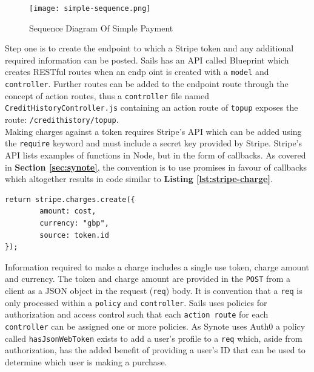 \begin{figure}[!hbt]
  	\centering
 	\texttt{[image: simple-sequence.png]}
  	\caption{Sequence Diagram Of Simple Payment}
 	\label{fig:simple-sequence}
\end{figure}

Step one is to create the endpoint to which a Stripe token and any additional required information can be posted. Sails has an API called Blueprint which creates RESTful routes when an endp oint is created with a \texttt{model} and \texttt{controller}. Further routes can be added to the endpoint route through the concept of action routes, thus a \texttt{controller} file named \texttt{CreditHistoryController.js} containing an action route of \texttt{topup} exposes the route: \texttt{/credithistory/topup}.\\

Making charges against a token requires Stripe's API \cite{stripe-api} which can be added using the \texttt{require} keyword and must include a secret key provided by Stripe. Stripe's API lists examples of functions in Node, but in the form of callbacks. As covered in \textbf{Section \ref{sec:synote}}, the convention is to use promises in favour of callbacks which altogether results in code similar to \textbf{Listing \ref{lst:stripe-charge}}.\\

\hspace{0.1\textwidth}
\begin{minipage}{.76\textwidth}

\begin{listing}[H]
\begin{verbatim}
return stripe.charges.create({
        amount: cost,
        currency: "gbp",
        source: token.id
});
\end{verbatim}
\label{lst:stripe-charge}
\end{listing}
\end{minipage}
\hspace{0.1\textwidth}
\vspace{0.3cm}

Information required to make a charge includes a single use token, charge amount and currency. The token and charge amount are provided in the \texttt{POST} from a client as a JSON object in the request (\texttt{req}) body. It is convention that a \texttt{req} is only processed within a \texttt{policy} and \texttt{controller}. Sails uses policies for authorization and access control such that each \texttt{action route} for each \texttt{controller} can be assigned one or more policies. As Synote uses Auth0 \cite{auth0} a policy called \texttt{hasJsonWebToken} exists to add a user's profile to a \texttt{req} which, aside from authorization, has the added benefit of providing a user's ID that can be used to determine which user is making a purchase.\\

